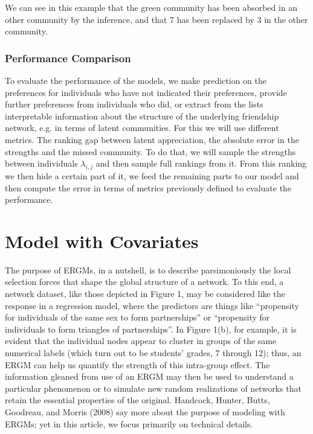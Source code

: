 \documentclass[12pt]{ociamthesis}  %
\begin{document}
	We can see in this example that the green community has been absorbed in an other community by the inference, and that 7 has been replaced by 3 in the other community.
	
	\subsection{Performance Comparison}
	
	To evaluate the performance of the models, we make prediction on the preferences for individuals who have not indicated their preferences, provide further preferences from individuals who did, or extract from the lists interpretable information about the structure of the underlying friendship network, e.g. in terms of latent communities. For this we will use different metrics. The ranking gap between latent appreciation, the absolute error in the strengths and the missed community. To do that, we will sample the strengths between individuals $\lambda_{i,j}$ and then sample full rankings from it. From this ranking we then hide a certain part of it, we feed the remaining parts to our model and then compute the error in terms of metrics previously defined to evaluate the performance.
	
	\chapter{Model with Covariates}
	
	The purpose of ERGMs, in a nutshell, is to describe parsimoniously the local selection forces
	that shape the global structure of a network. To this end, a network dataset, like those
	depicted in Figure 1, may be considered like the response in a regression model, where the
	predictors are things like “propensity for individuals of the same sex to form partnerships” or
	“propensity for individuals to form triangles of partnerships”. In Figure 1(b), for example, it
	is evident that the individual nodes appear to cluster in groups of the same numerical labels
	(which turn out to be students’ grades, 7 through 12); thus, an ERGM can help us quantify
	the strength of this intra-group effect. The information gleaned from use of an ERGM may
	then be used to understand a particular phenomenon or to simulate new random realizations
	of networks that retain the essential properties of the original. Handcock, Hunter, Butts,
	Goodreau, and Morris (2008) say more about the purpose of modeling with ERGMs; yet in
	this article, we focus primarily on technical details.
	
\end{document}
